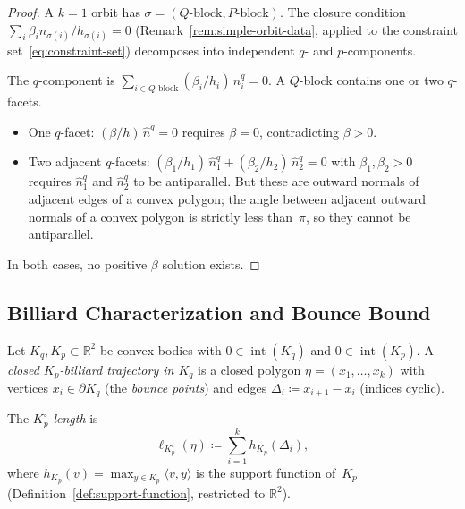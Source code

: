 \begin{proof}
A $k = 1$ orbit has $\sigma = (Q\text{-block}, P\text{-block})$.
The closure condition $\sum_i \beta_i n_{\sigma(i)} / h_{\sigma(i)} = 0$
(Remark~\ref{rem:simple-orbit-data}, applied to
the constraint set~\eqref{eq:constraint-set})
decomposes into independent $q$- and $p$-components.

The $q$-component is $\sum_{i \in Q\text{-block}}
(\beta_i / h_i)\, \hat{n}_i^q = 0$.
A $Q$-block contains one or two $q$-facets.
\begin{itemize}
\item One $q$-facet: $(\beta / h)\, \hat{n}^q = 0$ requires
  $\beta = 0$, contradicting $\beta > 0$.
\item Two adjacent $q$-facets: $(\beta_1 / h_1)\, \hat{n}_1^q
  + (\beta_2 / h_2)\, \hat{n}_2^q = 0$ with $\beta_1, \beta_2 > 0$
  requires $\hat{n}_1^q$ and $\hat{n}_2^q$ to be antiparallel.
  But these are outward normals of adjacent edges of a convex polygon;
  the angle between adjacent outward normals of a convex polygon
  is strictly less than~$\pi$, so they cannot be antiparallel.
\end{itemize}
In both cases, no positive $\beta$ solution exists.
\end{proof}

\subsection{Billiard Characterization and Bounce Bound}%
\label{subsec:bounce-bound}

\begin{definition}\label{def:billiard-trajectory}
Let $K_q, K_p \subset \mathbb{R}^2$ be convex bodies with
$0 \in \operatorname{int}(K_q)$ and $0 \in \operatorname{int}(K_p)$.
A \emph{closed $K_p$-billiard trajectory in $K_q$} is a closed
polygon $\eta = (x_1, \ldots, x_k)$ with vertices
$x_i \in \partial K_q$ (the \emph{bounce points})
and edges $\Delta_i \coloneqq x_{i+1} - x_i$ (indices cyclic).

The \emph{$K_p^\circ$-length} is
\[
  \ell_{K_p^\circ}(\eta) \coloneqq
  \sum_{i=1}^{k} h_{K_p}(\Delta_i),
\]
where $h_{K_p}(v) = \max_{y \in K_p} \langle v, y \rangle$
is the support function of~$K_p$
(Definition~\ref{def:support-function}, restricted to $\mathbb{R}^2$).
\end{definition}

